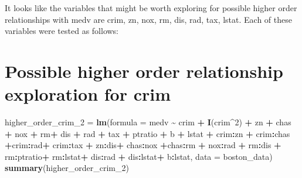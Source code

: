 \documentclass[
]{article}
\newenvironment{Shaded}{\begin{snugshade}}{\end{snugshade}}
\newcommand{\AttributeTok}[1]{\textcolor[rgb]{0.13,0.29,0.53}{#1}}
\newcommand{\DecValTok}[1]{\textcolor[rgb]{0.00,0.00,0.81}{#1}}
\newcommand{\FunctionTok}[1]{\textcolor[rgb]{0.13,0.29,0.53}{\textbf{#1}}}
\newcommand{\NormalTok}[1]{#1}
\newcommand{\OtherTok}[1]{\textcolor[rgb]{0.56,0.35,0.01}{#1}}
\newcommand{\SpecialCharTok}[1]{\textcolor[rgb]{0.81,0.36,0.00}{\textbf{#1}}}
\begin{document}
It looks like the variables that might be worth exploring for possible
higher order relationships with medv are crim, zn, nox, rm, dis, rad,
tax, lstat. Each of these variables were tested as follows:

\section{Possible higher order relationship exploration for
crim}\label{possible-higher-order-relationship-exploration-for-crim}

\begin{Shaded}
\begin{Highlighting}[]
\NormalTok{higher\_order\_crim\_2 }\OtherTok{=} \FunctionTok{lm}\NormalTok{(}\AttributeTok{formula =}\NormalTok{ medv }\SpecialCharTok{\textasciitilde{}}\NormalTok{ crim }\SpecialCharTok{+} \FunctionTok{I}\NormalTok{(crim}\SpecialCharTok{\^{}}\DecValTok{2}\NormalTok{) }\SpecialCharTok{+}\NormalTok{ zn }\SpecialCharTok{+}\NormalTok{ chas }\SpecialCharTok{+}\NormalTok{ nox }\SpecialCharTok{+}\NormalTok{ rm}\SpecialCharTok{+}\NormalTok{ dis }\SpecialCharTok{+}\NormalTok{ rad }\SpecialCharTok{+}\NormalTok{ tax }\SpecialCharTok{+}\NormalTok{ ptratio }\SpecialCharTok{+}\NormalTok{ b }\SpecialCharTok{+}\NormalTok{ lstat }\SpecialCharTok{+}\NormalTok{ crim}\SpecialCharTok{:}\NormalTok{zn }\SpecialCharTok{+}\NormalTok{ crim}\SpecialCharTok{:}\NormalTok{chas  }\SpecialCharTok{+}\NormalTok{crim}\SpecialCharTok{:}\NormalTok{rad}\SpecialCharTok{+}\NormalTok{ crim}\SpecialCharTok{:}\NormalTok{tax }\SpecialCharTok{+}\NormalTok{ zn}\SpecialCharTok{:}\NormalTok{dis}\SpecialCharTok{+}\NormalTok{ chas}\SpecialCharTok{:}\NormalTok{nox }\SpecialCharTok{+}\NormalTok{chas}\SpecialCharTok{:}\NormalTok{rm }\SpecialCharTok{+}\NormalTok{ nox}\SpecialCharTok{:}\NormalTok{rad }\SpecialCharTok{+}\NormalTok{ rm}\SpecialCharTok{:}\NormalTok{dis }\SpecialCharTok{+}\NormalTok{ rm}\SpecialCharTok{:}\NormalTok{ptratio}\SpecialCharTok{+}\NormalTok{ rm}\SpecialCharTok{:}\NormalTok{lstat}\SpecialCharTok{+}\NormalTok{ dis}\SpecialCharTok{:}\NormalTok{rad }\SpecialCharTok{+}\NormalTok{ dis}\SpecialCharTok{:}\NormalTok{lstat}\SpecialCharTok{+}\NormalTok{ b}\SpecialCharTok{:}\NormalTok{lstat, }\AttributeTok{data =}\NormalTok{ boston\_data)}
\FunctionTok{summary}\NormalTok{(higher\_order\_crim\_2)}
\end{Highlighting}
\end{Shaded}
\end{document}
